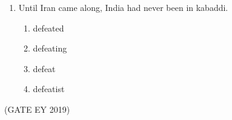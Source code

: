 \documentclass[journal,12pt,onecolumn]{IEEEtran}
\theoremstyle{remark}
\begin{document}
\begin{enumerate}
    Which is the second number from the right?  
    \begin{multicols}{4}
    \begin{enumerate}
        \item 2
        \item 4
        \item 7
        \item 10
    \end{enumerate}
    \end{multicols}
    \hfill{(GATE EY 2019)}

    \item Until Iran came along, India had never been \underline{\hspace{1.5cm}} in kabaddi.  
    \begin{multicols}{4}
    \begin{enumerate}
        \item defeated
        \item defeating
        \item defeat
        \item defeatist
    \end{enumerate}
    \end{multicols}
\end{enumerate}
\hfill{(GATE EY 2019)}
\end{document}
